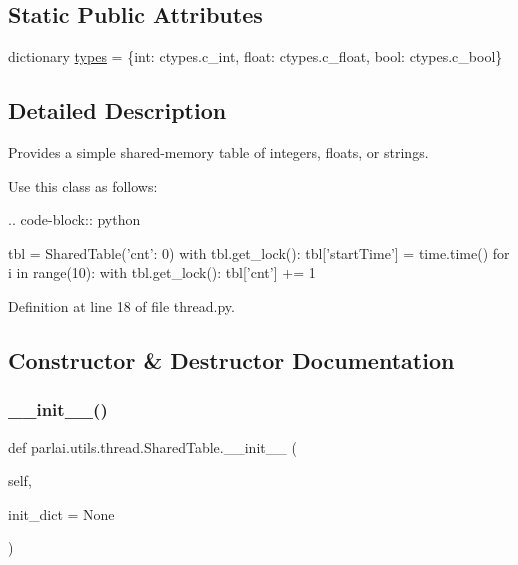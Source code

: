 \subsection*{Static Public Attributes}
\begin{DoxyCompactItemize}
\item 
dictionary \hyperlink{classparlai_1_1utils_1_1thread_1_1SharedTable_afe67b490096de733e17e35834a5b55f4}{types} = \{int\+: ctypes.\+c\+\_\+int, float\+: ctypes.\+c\+\_\+float, bool\+: ctypes.\+c\+\_\+bool\}
\end{DoxyCompactItemize}


\subsection{Detailed Description}
\begin{DoxyVerb}Provides a simple shared-memory table of integers, floats, or strings.

Use this class as follows:

.. code-block:: python

    tbl = SharedTable({'cnt': 0})
    with tbl.get_lock():
        tbl['startTime'] = time.time()
    for i in range(10):
        with tbl.get_lock():
            tbl['cnt'] += 1
\end{DoxyVerb}
 

Definition at line 18 of file thread.\+py.



\subsection{Constructor \& Destructor Documentation}
\mbox{\label{classparlai_1_1utils_1_1thread_1_1SharedTable_a52b58b8d6ad0ba31cf2e3236afe970a5}} 
\subsubsection{\texorpdfstring{\+\_\+\+\_\+init\+\_\+\+\_\+()}{\_\_init\_\_()}}
{\footnotesize\ttfamily def parlai.\+utils.\+thread.\+Shared\+Table.\+\_\+\+\_\+init\+\_\+\+\_\+ (\begin{DoxyParamCaption}\item[{}]{self,  }\item[{}]{init\+\_\+dict = {\ttfamily None} }\end{DoxyParamCaption})}

